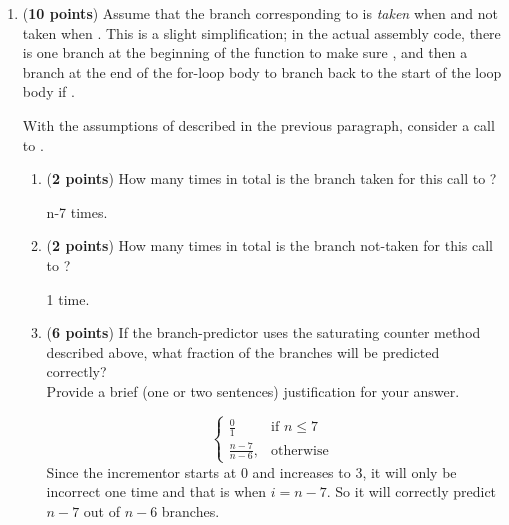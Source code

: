 \documentclass{article}
\newenvironment{answer}
{\par\color{blue}}
{\normalfont\par}
\begin{document}
\begin{enumerate}
          \begin{enumerate}
              \item (\textbf{10 points})
                    Assume that the branch corresponding to  is \emph{taken} when
                     and not taken when .
                    This is a slight simplification; in the actual assembly code, there is one branch at
                    the beginning of the  function to make sure , and then
                    a branch at the end of the for-loop body to branch back to the start of the loop body
                    if .
                    \par
                    With the assumptions of described in the previous paragraph, consider a call to
                     .
                    \begin{enumerate}
                        \item (\textbf{2 points}) How many times in total is the branch taken for this call to ?
                              \begin{answer}
                                  n-7 times.
                              \end{answer}
                        \item (\textbf{2 points}) How many times in total is the branch not-taken for this call to ?
                              \begin{answer}
                                  1 time.
                              \end{answer}
                        \item (\textbf{6 points}) If the branch-predictor uses the saturating counter method described above,
                              what fraction of the  branches will be predicted correctly?\\
                              Provide a brief (one or two sentences) justification for your answer.
                              \begin{answer}
                                  \begin{displaymath}
                                      \left\{
                                      \begin{array}{ll}
                                          \frac{0}{1}      & \text{if } n \leq 7 \\[5pt]
                                          \frac{n-7}{n-6}, & \text{otherwise }
                                      \end{array}
                                      \right.
                                  \end{displaymath}
                                  Since the incrementor starts at 0 and increases to 3, it will only be incorrect one time and that is when $i = n - 7$. So it will correctly predict $n - 7$ out of $n - 6$ branches.
                              \end{answer}
                    \end{enumerate}


\end{enumerate}
\end{enumerate}
\end{document}
